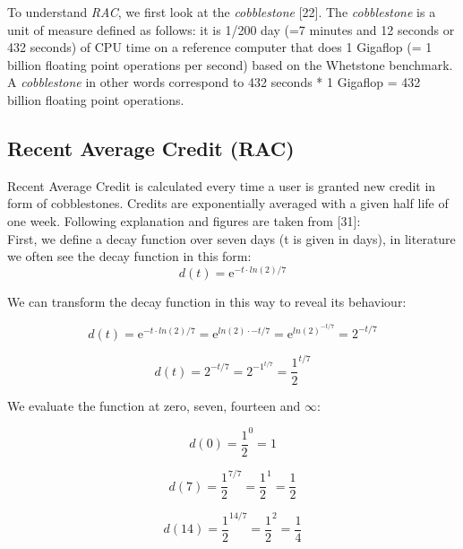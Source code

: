 To understand \textit{RAC}, we first look at the \textit{cobblestone} [22]. The \textit{cobblestone} is a unit of measure defined as follows: it is 1/200 day (=7 minutes and 12 seconds or 432 seconds) of CPU time on a reference computer that does 1 Gigaflop (= 1 billion floating point operations per second) based on the Whetstone benchmark. A \textit{cobblestone} in other words correspond to 432 seconds * 1 Gigaflop = 432 billion floating point operations.\\


\subsection{Recent Average Credit (RAC)}

Recent Average Credit is calculated every time a user is granted new credit in form of cobblestones. Credits are exponentially averaged with a given half life of one week. Following explanation and figures are taken from [31]:\\

First, we define a decay function over seven days (t is given in days), in literature we often see the decay function in this form:\\

\begin{equation}
d(t) =  \mathrm{e}^{-t \cdot  ln(2) / 7}  
\end{equation}

We can transform the decay function in this way to reveal its behaviour:

\begin{equation}
d(t) =  \mathrm{e}^{-t \cdot  ln(2) / 7} = \mathrm{e}^{ln(2) \cdot  -t/7} = \mathrm{e}^{ln(2)^{-t/7}} = 2^{-t/7}
\end{equation}

\begin{equation}
d(t) =  2^{-t/7} =  2^{-1^{t/7}} = \frac{1}{2}^{t/7}
\end{equation}

We evaluate the function at zero, seven, fourteen and $\infty$:

\begin{equation}
d(0) = \frac{1}{2}^{0} = 1
\end{equation}

\begin{equation}
d(7) = \frac{1}{2}^{7/7} = \frac{1}{2}^{1} = \frac{1}{2} 
\end{equation}

\begin{equation}
d(14) = \frac{1}{2}^{14/7} = \frac{1}{2}^{2} = \frac{1}{4} 
\end{equation}

